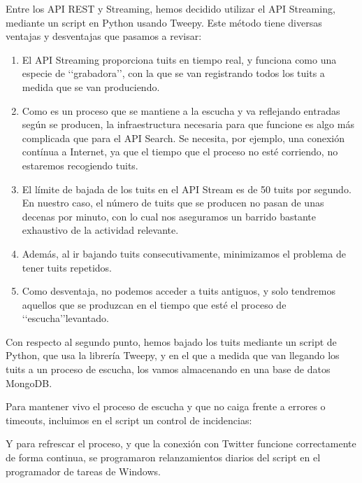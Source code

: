 Entre los API REST y Streaming, hemos decidido utilizar el API Streaming, mediante un script
en Python usando Tweepy. Este método tiene diversas ventajas y desventajas que pasamos
a revisar:
\begin{enumerate}
\item El API Streaming proporciona tuits en tiempo real, y funciona como una especie de \lq\lq grabadora\rq\rq,
con la que se van registrando todos los tuits a medida que se van produciendo.
\item Como es un proceso que se mantiene a la escucha y va reflejando entradas según
se producen, la infraestructura necesaria para que funcione es algo  más complicada que para
el API Search. Se necesita, por ejemplo, una conexión contínua a Internet, ya que el tiempo que
el proceso no esté corriendo, no estaremos recogiendo tuits.
\item El límite de bajada de los tuits en el API Stream es de 50 tuits por segundo.
En nuestro caso, el número de tuits que se producen no pasan de unas decenas por minuto, con
lo cual nos aseguramos un barrido bastante exhaustivo de la actividad relevante.
\item Además, al ir bajando tuits consecutivamente, minimizamos el problema de tener tuits repetidos.
\item Como desventaja, no podemos acceder a tuits antiguos, y solo tendremos aquellos que 
se produzcan en el tiempo que esté el proceso de \lq\lq escucha\rq\rq levantado.
\end{enumerate}

Con respecto al segundo punto, hemos bajado los tuits mediante un script de Python, 
que usa la librería Tweepy, y 
en el que a medida que van llegando los tuits a un proceso de escucha, los vamos 
almacenando en una base de datos MongoDB. 


Para mantener vivo el proceso de escucha y que no caiga frente a errores o timeouts,
incluimos en el script un control de incidencias:


Y para refrescar el proceso, y que la conexión con Twitter funcione correctamente
de forma continua, se programaron relanzamientos diarios del script en el programador 
de tareas de Windows.
 
